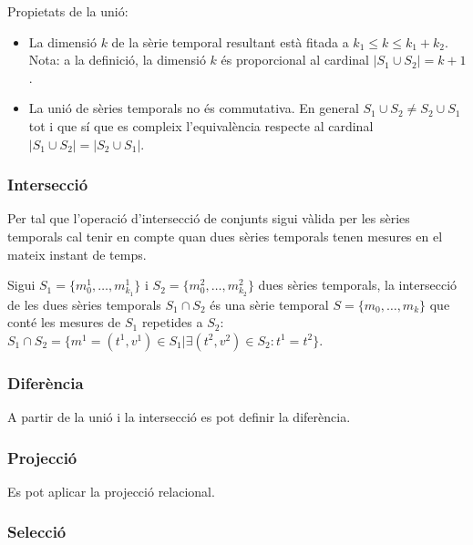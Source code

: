 Propietats de la unió:

\begin{itemize}
\item La dimensió $k$ de la sèrie temporal resultant està fitada a
  $k_1 \leq k \leq k_1 + k_2$. Nota: a la definició, la dimensió $k$ és
  proporcional al cardinal $|S_1\cup S_2| = k+1$.
\item La unió de sèries temporals no és commutativa. En general
  $S_1\cup S_2 \neq S_2\cup S_1$ tot i que sí que es compleix
  l'equivalència respecte al cardinal $|S_1\cup S_2| = |S_2\cup S_1|$.
\end{itemize}











\subsubsection{Intersecció}

Per tal que l'operació d'intersecció de conjunts sigui vàlida per les sèries
temporals cal tenir en compte quan dues sèries temporals tenen mesures
en el mateix instant de temps.

\begin{definition}[intersecció]
  Sigui $S_1=\{m_0^1, \dotsc, m_{k_1}^1\}$ i $S_2=\{m_0^2, \dotsc,
  m_{k_2}^2\}$ dues sèries temporals, la intersecció de les dues
  sèries temporals $S_1 \cap S_2$ és una sèrie temporal $S=\{m_0,
  \dotsc, m_k\}$ que conté les mesures de $S_1$ repetides a $S_2$:
  $S_1 \cap S_2 = \{ m^1 = (t^1,v^1) \in S_1 | \exists (t^2,v^2)\in
  S_2 : t^1 = t^2\}$.
\end{definition}


\subsubsection{Diferència}

A partir de la unió i la intersecció es pot definir la diferència.



\subsubsection{Projecció}


Es pot aplicar la projecció relacional.


\subsubsection{Selecció}



